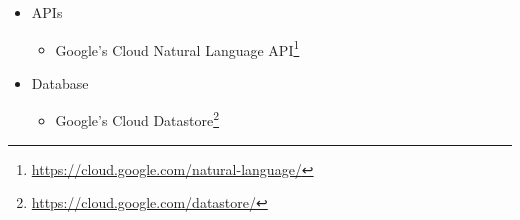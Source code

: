 \begin{itemize}
\begin{itemize}
	\end{itemize}
    \item APIs
     \begin{itemize}
		\item Google's Cloud Natural Language API\footnote[2]{\url{https://cloud.google.com/natural-language/}}
	\end{itemize}
    \item Database
     \begin{itemize}
   	 	\item Google's Cloud Datastore\footnote[3]{\url{https://cloud.google.com/datastore/}}
	\end{itemize}
\end{itemize}